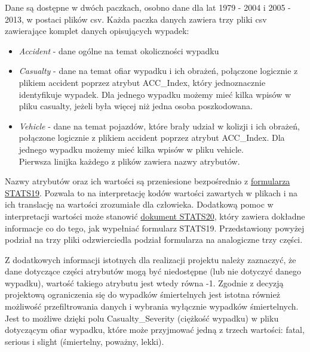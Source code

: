 Dane są dostępne w dwóch paczkach, osobno dane dla lat 1979 - 2004 i
2005 - 2013, w postaci plików csv. Każda paczka danych zawiera trzy
pliki csv zawierające komplet danych opisujących wypadek:

\begin{itemize}
\itemsep-14pt\parskip0pt
\item
  \emph{Accident} - dane ogólne na temat okoliczności wypadku\\
\item
  \emph{Casualty} - dane na temat ofiar wypadku i ich obrażeń, połączone
  logicznie z plikiem accident poprzez atrybut ACC\_Index, który
  jednoznacznie identyfikuje wypadek. Dla jednego wypadku możemy mieć
  kilka wpisów w pliku casualty, jeżeli była więcej niż jedna osoba
  poszkodowana.\\
\item
  \emph{Vehicle} - dane na temat pojazdów, które brały udział w kolizji
  i ich obrażeń, połączone logicznie z plikiem accident poprzez atrybut
  ACC\_Index. Dla jednego wypadku możemy mieć kilka wpisów w pliku
  vehicle.\\Pierwsza linijka każdego z plików zawiera nazwy atrybutów.
\end{itemize}

Nazwy atrybutów oraz ich wartości są przeniesione bezpośrednio z
\href{https://www.gov.uk/government/uploads/system/uploads/attachment_data/file/230590/stats19.pdf}{formularza
STATS19}. Pozwala to na interpretację kodów wartości zawartych w plikach
i na ich translację na wartości zrozumiałe dla człowieka. Dodatkową
pomoc w interpretacji wartości może stanowić
\href{https://www.gov.uk/government/uploads/system/uploads/attachment_data/file/230596/stats20-2011.pdf}{dokument
STATS20}, który zawiera dokładne informacje co do tego, jak wypełniać
formularz STATS19. Przedstawiony powyżej podział na trzy pliki
odzwierciedla podział formularza na analogiczne trzy części.

Z dodatkowych informacji istotnych dla realizacji projektu należy
zaznaczyć, że dane dotyczące części atrybutów mogą być niedostępne (lub
nie dotyczyć danego wypadku), wartość takiego atrybutu jest wtedy równa
-1. Zgodnie z decyzją projektową ograniczenia się do wypadków
śmiertelnych jest istotna również możliwość przefiltrowania danych i
wybrania wyłącznie wypadków śmiertelnych. Jest to możliwe dzięki polu
Casualty\_Severity (ciężkość wypadku) w pliku dotyczącym ofiar wypadku,
które może przyjmować jedną z trzech wartości: fatal, serious i slight
(śmiertelny, poważny, lekki).

